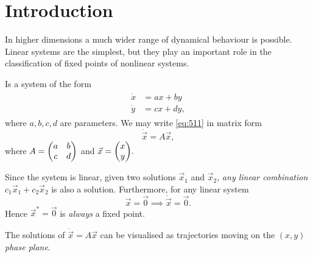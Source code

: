 \documentclass[oneside]{book}
\begin{document}
\section{Introduction}
In higher dimensions a much wider range of dynamical behaviour is possible. Linear systems are the simplest, but they play an important role in the classification of fixed points of nonlinear systems.
\begin{definition}
	Is a system of the form
	\begin{align} \label{eq:511}
	\begin{split}
		\dot{x} &= ax + by \\
		\dot{y} &= cx + dy,
	\end{split}
	\end{align}
	where $ a, b, c, d $ are parameters. We may write \eqref{eq:511} in matrix form
	\begin{equation} \label{eq:512}
		\dot{\vec{x}} = A \vec{x},
	\end{equation}
	where $ A = \mqty(a & b \\ c & d) $ and $ \vec{x} = \mqty(x \\ y). $
\end{definition}
Since the system is linear, given two solutions $ \vec{x}_1 $ and $ \vec{x}_2 $, \textit{any linear combination} $ c_1 \vec{x}_1 + c_2 \vec{x}_2 $ is also a solution. Furthermore, for any linear system
\[
\vec{x} = \vec{0} \implies \dot{\vec{x}} = \vec{0}.
\]
Hence $ \vec{x}^* = \vec{0} $ is \textit{always} a fixed point.
\par
The solutions of $ \dot{\vec{x}} = A \vec{x} $ can be visualised as trajectories moving on the $ (x, y) $ \textit{phase plane}.
\end{document}

